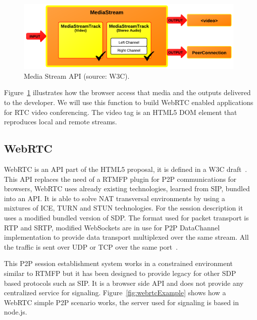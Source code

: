  \begin{figure}[h]
  \centering
    \includegraphics[scale=1]{./figures/mediastreamAPI.png}
      \caption[Media Stream API (source: W3C)]{Media Stream API (source: W3C).}
	\label{fig:mediastreamAPI}
\end{figure}

Figure~\ref{fig:mediastreamAPI} illustrates how the browser access that media and the outputs delivered to the developer. We will use this function to build WebRTC enabled applications for RTC video conferencing. The video tag is an HTML5 DOM element that reproduces local and remote streams.

\subsection{WebRTC}

WebRTC is an API part of the HTML5 proposal, it is defined in a W3C draft~\cite{webrtcW3cgroup}. This API replaces the need of a RTMFP plugin for P2P communications for browsers, WebRTC uses already existing technologies, learned from SIP, bundled into an API. It is able to solve NAT transversal environments by using a mixtures of ICE, TURN and STUN technologies. For the session description it uses a modified bundled version of SDP. The format used for packet transport is RTP and SRTP, modified WebSockets are in use for P2P DataChannel implementation to provide data transport multiplexed over the same stream. All the traffic is sent over UDP or TCP over the same port~\cite{alvestrandOverview2012}.

This P2P session establishment system works in a constrained environment similar to RTMFP but it has been designed to provide legacy for other SDP based protocols such as SIP. It is a browser side API and does not provide any centralized service for signaling. Figure~\ref{fig:webrtcExample} shows how a WebRTC simple P2P scenario works, the server used for signaling is based in node.js.

